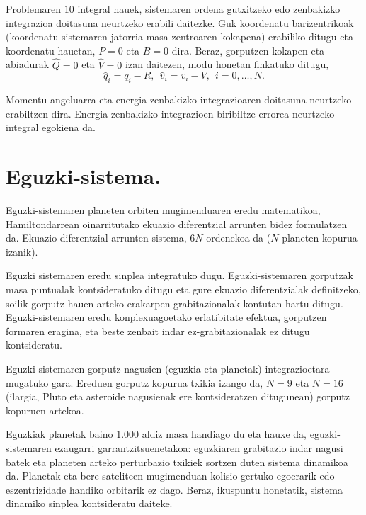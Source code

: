 Problemaren $10$ integral hauek, sistemaren ordena gutxitzeko edo zenbakizko integrazioa doitasuna neurtzeko erabili daitezke. Guk koordenatu barizentrikoak (koordenatu sistemaren jatorria masa zentroaren kokapena) erabiliko ditugu eta koordenatu hauetan, $P=0$ eta $B=0$ dira. Beraz, gorputzen kokapen eta abiadurak $\hat{Q}=0$ eta $\hat{V}=0$ izan daitezen, modu honetan finkatuko ditugu,
\begin{equation*}
\hat{q}_i=q_i-R, \ \  \hat{v}_i=v_i-V, \ \ i=0,\dots,N.
\end{equation*}

Momentu angeluarra eta energia zenbakizko integrazioaren doitasuna neurtzeko erabiltzen dira. Energia zenbakizko integrazioen biribiltze errorea neurtzeko integral egokiena da.

\section{Eguzki-sistema.}
\label{ss:34}

Eguzki-sistemaren planeten orbiten mugimenduaren eredu matematikoa, Hamiltondarrean oinarritutako ekuazio diferentzial arrunten bidez formulatzen da. Ekuazio diferentzial arrunten sistema, $6N$ ordenekoa da ($N$ planeten kopurua izanik).

Eguzki sistemaren eredu sinplea integratuko dugu. Eguzki-sistemaren gorputzak masa puntualak kontsideratuko ditugu eta gure ekuazio diferentzialak definitzeko, soilik gorputz hauen arteko erakarpen grabitazionalak kontutan hartu ditugu. Eguzki-sistemaren eredu konplexuagoetako erlatibitate efektua, gorputzen formaren eragina, eta beste zenbait indar ez-grabitazionalak ez ditugu kontsideratu.

Eguzki-sistemaren gorputz nagusien (eguzkia eta planetak) integrazioetara mugatuko gara. Ereduen gorputz kopurua txikia izango da, $N=9$ eta $N=16$ (ilargia, Pluto eta asteroide nagusienak ere kontsideratzen ditugunean) gorputz kopuruen artekoa.

Eguzkiak planetak baino $1.000$ aldiz masa handiago du eta hauxe da, eguzki-sistemaren ezaugarri garrantzitsuenetakoa: eguzkiaren grabitazio indar nagusi batek eta planeten arteko perturbazio txikiek sortzen duten sistema dinamikoa da. Planetak eta bere sateliteen mugimenduan kolisio gertuko egoerarik edo eszentrizidade handiko orbitarik ez dago. Beraz, ikuspuntu honetatik, sistema dinamiko sinplea kontsideratu daiteke.  

